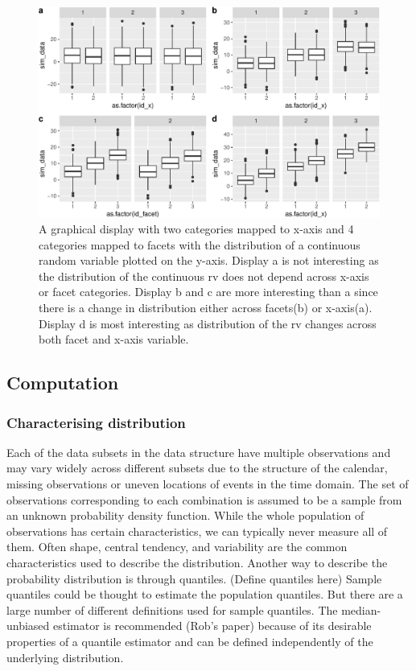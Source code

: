 \documentclass[
]{article}
\begin{document}
\begin{figure}

{\centering \includegraphics[width=\textwidth]{figure/null4by2-1} 

}

\caption{ A graphical display with two categories mapped to x-axis and 4 categories mapped to facets with the distribution of a continuous random variable plotted on the y-axis. Display a is not interesting as the distribution of the continuous rv does not depend across x-axis or facet categories. Display b and c are more interesting than a since there is a change in distribution either across facets(b) or x-axis(a). Display d is most interesting as distribution of the rv changes across both facet and x-axis variable.}\label{fig:null4by2}
\end{figure}

\hypertarget{computation}{%
\subsection{Computation}\label{computation}}

\hypertarget{characterising-distribution}{%
\subsubsection{Characterising distribution}\label{characterising-distribution}}

Each of the data subsets in the data structure have multiple observations and may vary widely across different subsets due to the structure of the calendar, missing observations or uneven locations of events in the time domain. The set of observations corresponding to each combination is assumed to be a sample from an unknown probability density function.
While the whole population of observations has certain characteristics, we can typically never measure all of them. Often shape, central tendency, and variability are the common characteristics used to describe the distribution. Another way to describe the probability distribution is through quantiles. (Define quantiles here) Sample quantiles could be thought to estimate the population quantiles. But there are a large number of different definitions used for sample quantiles. The median-unbiased estimator is recommended (Rob's paper) because of its desirable properties of a quantile estimator and can be defined independently of the underlying distribution.
\end{document}
